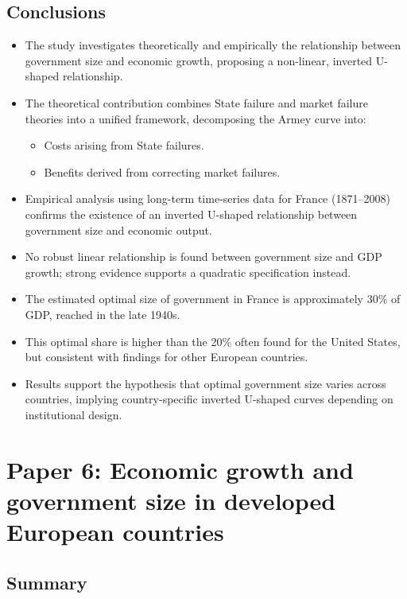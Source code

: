 \documentclass[10pt, oneside]{article}
\begin{document}
\subsection{Conclusions}

\begin{itemize}
	\item The study investigates theoretically and empirically the relationship between government size and economic growth, proposing a non-linear, inverted U-shaped relationship.
	\item The theoretical contribution combines State failure and market failure theories into a unified framework, decomposing the Armey curve into:
	      \begin{itemize}
		      \item Costs arising from State failures.
		      \item Benefits derived from correcting market failures.
	      \end{itemize}
	\item Empirical analysis using long-term time-series data for France (1871--2008) confirms the existence of an inverted U-shaped relationship between government size and economic output.
	\item No robust linear relationship is found between government size and GDP growth; strong evidence supports a quadratic specification instead.
	\item The estimated optimal size of government in France is approximately 30\% of GDP, reached in the late 1940s.
	\item This optimal share is higher than the 20\% often found for the United States, but consistent with findings for other European countries.
	\item Results support the hypothesis that optimal government size varies across countries, implying country-specific inverted U-shaped curves depending on institutional design.
\end{itemize}

\section{Paper 6: Economic growth and government size in developed European countries}

\subsection{Summary}
\end{document}
